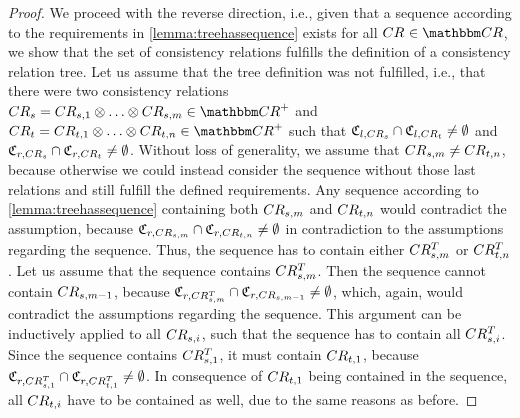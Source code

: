 \begin{proof}
    We proceed with the reverse direction, i.e., given that a sequence according to the requirements in \autoref{lemma:treehassequence} exists for all $\consistencyrelation{CR}{} \in \consistencyrelationset{CR}$, we show that the set of consistency relations fulfills the definition of a consistency relation tree.
    Let us assume that the tree definition was not fulfilled, i.e., that there were two consistency relations $\consistencyrelation{CR}{s} = \consistencyrelation{CR}{s,1} \concat \dots \concat \consistencyrelation{CR}{s,m} \in \transitiveclosure{\consistencyrelationset{CR}}$ and $\consistencyrelation{CR}{t} = \consistencyrelation{CR}{t,1} \concat \dots \concat \consistencyrelation{CR}{t,n} \in \transitiveclosure{\consistencyrelationset{CR}}$ such that $\mathfrak{C}_{l,CR_{s}} \cap \mathfrak{C}_{l,CR_{t}} \neq \emptyset$ and $\mathfrak{C}_{r,CR_{s}} \cap \mathfrak{C}_{r,CR_{t}} \neq \emptyset$.
    Without loss of generality, we assume that $CR_{s,m} \neq CR_{t,n}$, because otherwise we could instead consider the sequence without those last relations and still fulfill the defined requirements.
    Any sequence according to \autoref{lemma:treehassequence} containing both $CR_{s,m}$ and $CR_{t,n}$ would contradict the assumption, because $\mathfrak{C}_{r,CR_{s,m}} \cap \mathfrak{C}_{r,CR_{t,n}} \neq \emptyset$ in contradiction to the assumptions regarding the sequence.
    Thus, the sequence has to contain either $CR^T_{s,m}$ or $CR^T_{t,n}$.
    Let us assume that the sequence contains $CR^T_{s,m}$.
    Then the sequence cannot contain $CR_{s,m-1}$, because $\mathfrak{C}_{r,CR^T_{s,m}} \cap \mathfrak{C}_{r,CR_{s,m-1}} \neq \emptyset$, which, again, would contradict the assumptions regarding the sequence.
    This argument can be inductively applied to all $CR_{s,i}$, such that the sequence has to contain all $CR^T_{s,i}$.
    Since the sequence contains $CR^T_{s,1}$, it must contain $CR_{t,1}$, because $\mathfrak{C}_{r,CR^T_{s,1}} \cap \mathfrak{C}_{r,CR^T_{t,1}} \neq \emptyset$.
    In consequence of $CR_{t,1}$ being contained in the sequence, all $CR_{t,i}$ have to be contained as well, due to the same reasons as before.

\end{proof}
